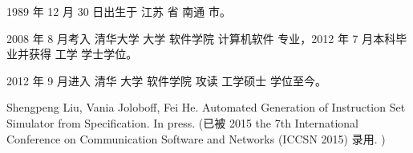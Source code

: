 \begin{resume}


1989 年 12 月 30 日出生于 江苏 省 南通 市。

2008 年 8 月考入 清华大学 大学 软件学院 计算机软件 专业，2012 年 7 月本科毕业并获得 工学 学士学位。

2012 年 9 月进入 清华 大学 软件学院 攻读 工学硕士 学位至今。


\begin{enumerate}[{[}1{]}]
   	\item Shengpeng Liu, Vania Joloboff, Fei He. Automated Generation of Instruction Set Simulator from Specification. In press. (已被 2015 the 7th International Conference on Communication Software and Networks (ICCSN 2015) 录用. )
\end{enumerate}

\end{resume}
